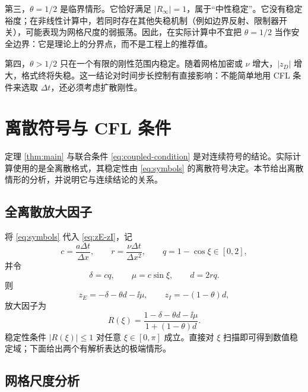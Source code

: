 第三，$\theta=1/2$ 是临界情形。它恰好满足 $|R_\infty|=1$，属于“中性稳定”。它没有稳定裕度；在非线性计算中，若同时存在其他失稳机制（例如边界反射、限制器开关），可能表现为网格尺度的弱振荡。因此，在实际计算中不宜把 $\theta=1/2$ 当作安全边界：它是理论上的分界点，而不是工程上的推荐值。

第四，$\theta>1/2$ 只在一个有限的刚性范围内稳定。随着网格加密或 $\nu$ 增大，$|z_D|$ 增大，格式终将失稳。这一结论对时间步长控制有直接影响：不能简单地用 CFL 条件来选取 $\Delta t$，还必须考虑扩散刚性。

\section{离散符号与 CFL 条件}
\label{sec:discrete-symbol}

定理 \ref{thm:main} 与联合条件 \eqref{eq:coupled-condition} 是对连续符号的结论。实际计算使用的是全离散格式，其稳定性由 \eqref{eq:symbols} 的离散符号决定。本节给出离散情形的分析，并说明它与连续结论的关系。

\subsection{全离散放大因子}

将 \eqref{eq:symbols} 代入 \eqref{eq:zE-zI}，记
\begin{equation}
  c=\frac{a\Delta t}{\Delta x},\qquad
  r=\frac{\nu\Delta t}{\Delta x^2},\qquad
  q=1-\cos\xi\in[0,2],
  \label{eq:c-r-q}
\end{equation}
并令
\begin{equation}
  \delta=cq,\qquad \mu=c\sin\xi,\qquad d=2rq.
  \label{eq:delta-mu-d}
\end{equation}
则
\begin{equation}
  z_E=-\delta-\theta d-\ii\mu,
  \qquad
  z_I=-(1-\theta)d,
  \label{eq:zE-discrete}
\end{equation}
放大因子为
\begin{equation}
  R(\xi)=\frac{1-\delta-\theta d-\ii\mu}{1+(1-\theta)d}.
  \label{eq:R-discrete}
\end{equation}
稳定性条件 $|R(\xi)|\le1$ 对任意 $\xi\in[0,\pi]$ 成立。直接对 $\xi$ 扫描即可得到数值稳定域；下面给出两个有解析表达的极端情形。

\subsection{网格尺度分析}

